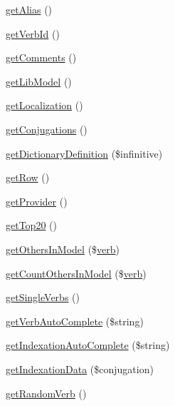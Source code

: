 \begin{DoxyCompactItemize}
\item 
\hyperlink{class_conjugation_manager_base_ae737f3f0ee24fc29c25460391bd66ac1}{get\+Alias} ()
\item 
\hyperlink{class_conjugation_manager_base_a840c42ab40fd243dc6fc60f977919c39}{get\+Verb\+Id} ()
\item 
\hyperlink{class_conjugation_manager_base_aa6fcffaba728e6eb5b28503066bd4b0f}{get\+Comments} ()
\item 
\hyperlink{class_conjugation_manager_base_a408ff3238b71c5e124eb4226a6a92792}{get\+Lib\+Model} ()
\item 
\hyperlink{class_conjugation_manager_base_a4c0cb7963519040f87daf34541f9ddb9}{get\+Localization} ()
\item 
\hyperlink{class_conjugation_manager_base_acc0444052a240e9b9afabc6f045f9062}{get\+Conjugations} ()
\item 
\hyperlink{class_conjugation_manager_base_a00fa131c934b5e69b396090dc393215d}{get\+Dictionary\+Definition} (\$infinitive)
\item 
\hyperlink{class_conjugation_manager_base_a6ac46ba320536e11f2f0eedb2e04fced}{get\+Row} ()
\item 
\hyperlink{class_conjugation_manager_base_a1d66b72e31e4eff2263a15837e7a7c7d}{get\+Provider} ()
\item 
\hyperlink{class_conjugation_manager_base_a63728ecfb3a2eb259accf59dd79e9c26}{get\+Top20} ()
\item 
\hyperlink{class_conjugation_manager_base_ac463846b6db0ebc24dbcc8ee08cf0fae}{get\+Others\+In\+Model} (\$\hyperlink{teibase_8php_aa8d8fadfcf4239c7aa288414da9d0ace}{verb})
\item 
\hyperlink{class_conjugation_manager_base_a170ee674be3f030087e4e77489623e4a}{get\+Count\+Others\+In\+Model} (\$\hyperlink{teibase_8php_aa8d8fadfcf4239c7aa288414da9d0ace}{verb})
\item 
\hyperlink{class_conjugation_manager_base_adaa1d873ae00ca4cd2dcba8bac138b88}{get\+Single\+Verbs} ()
\item 
\hyperlink{class_conjugation_manager_base_ac645c98d094ad5be6eec9950d04ee937}{get\+Verb\+Auto\+Complete} (\$string)
\item 
\hyperlink{class_conjugation_manager_base_a8686180500ee969d111c7764d52a1725}{get\+Indexation\+Auto\+Complete} (\$string)
\item 
\hyperlink{class_conjugation_manager_base_a51e5b1141591ac39b9b92a46411b688c}{get\+Indexation\+Data} (\$conjugation)
\item 
\hyperlink{class_conjugation_manager_base_ac2e82ace9b19d7b014908ec275b552bc}{get\+Random\+Verb} ()

\end{DoxyCompactItemize}

